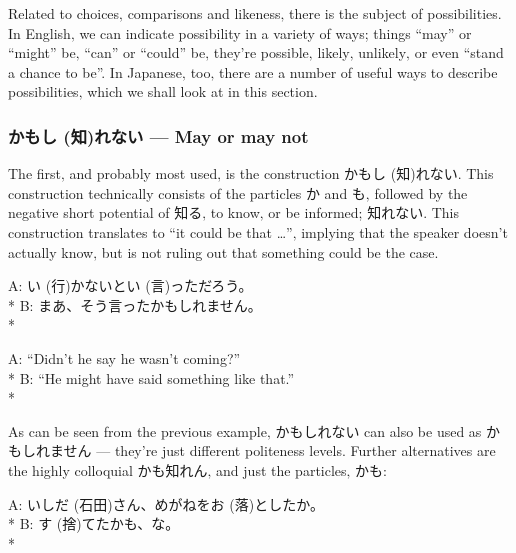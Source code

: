 \documentclass[11pt, b5paper, twoside, openright, onecolumn]{book}
\makeatletter
\newcommand*{\rubystack}[2]{{\relscale{0.5}%
  \begin{tabular}[b]{@{}c@{}}%
    {#1}\\%
   {\textscale{2}{#2}}%
  \end{tabular}}%
}
\DeclareRobustCommand*{\ruby}[2]{%
  \mbox{%
    \setlength{\parskip}{0ex}%
    \BeginAccSupp{method=pdfstringdef,ActualText={#1}}%
      \rubystack{\phantom{#2}}{#1}%
      \llap{%
        \rubystack{#2}{\phantom{#1}}%
      }%
    \EndAccSupp{}%
  }%
}
\renewcommand*{\ruby}[2]{#2 (#1)}%
\newenvironment{exampleblock}{
\setlength{\parindent}{0.6in}
\begin{minipage}[t]{\dimexpr\textwidth-\parindent}}
{\end{minipage}}
\makeatother
\begin{document}
Related to choices‚ comparisons and likeness‚ there is the subject of possibilities. In English‚ we can indicate possibility in a variety of ways; things “may” or “might” be‚ “can” or “could” be‚ they’re possible‚ likely‚ unlikely‚ or even “stand a chance to be”. In Japanese‚ too‚ there are a number of useful ways to describe possibilities‚ which we shall look at in this section.

\subsubsection{かも\ruby{知}{し}れない — May or may not}

The first‚ and probably most used‚ is the construction かも\ruby{知}{し}れない. This construction technically consists of the particles か and も‚ followed by the negative short potential of 知る‚ to know‚ or be informed; 知れない. This construction translates to “it could be that …”‚ implying that the speaker doesn’t actually know‚ but is not ruling out that something could be the case.

\vspace{0.4cm}
\begin{exampleblock}
A: \ruby{行}{い}かないと\ruby{言}{い}っただろう。 \\* 
B: まあ、そう言ったかもしれません。 \\* 
\end{exampleblock}
\vspace{0.2cm}

\begin{exampleblock}
A: “Didn’t he say he wasn’t coming?” \\* 
B: “He might have said something like that.” \\* 
\end{exampleblock}
\vspace{0.2cm}

As can be seen from the previous example‚ かもしれない can also be used as かもしれません — they’re just different politeness levels. Further alternatives are the highly colloquial かも知れん‚ and just the particles‚ かも:

\vspace{0.4cm}
\begin{exampleblock}
A: \ruby{石田}{いしだ}さん、めがねを\ruby{落}{お}としたか。 \\* 
B: \ruby{捨}{す}てたかも、な。 \\* 
\end{exampleblock}
\vspace{0.2cm}
\end{document}

